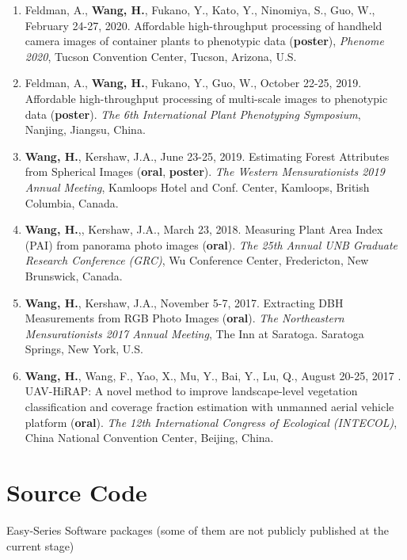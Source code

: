 \begin{singlespace}
\begin{enumerate}
  \item Feldman, A., \textbf{Wang, H.}, Fukano, Y., Kato, Y., Ninomiya, S., Guo, W., February 24-27, 2020. Affordable high-throughput processing of handheld camera images of container plants to phenotypic data (\textbf{poster}), \textit{Phenome 2020}, Tucson Convention Center, Tucson, Arizona, U.S.
  \item Feldman, A., \textbf{Wang, H.}, Fukano, Y., Guo, W., October 22-25, 2019. Affordable high-throughput processing of multi-scale images to phenotypic data (\textbf{poster}). \textit{The 6th International Plant Phenotyping Symposium}, Nanjing, Jiangsu, China.
  \item \textbf{Wang, H.}, Kershaw, J.A., June 23-25, 2019. Estimating Forest Attributes from Spherical Images (\textbf{oral}, \textbf{poster}). \textit{The Western Mensurationists 2019 Annual Meeting}, Kamloops Hotel and Conf. Center, Kamloops, British Columbia, Canada.
  \item \textbf{Wang, H.},, Kershaw, J.A., March 23, 2018. Measuring Plant Area Index (PAI) from panorama photo images (\textbf{oral}). \textit{The 25th Annual UNB Graduate Research Conference (GRC)}, Wu Conference Center, Fredericton, New Brunswick, Canada.
  \item \textbf{Wang, H.}, Kershaw, J.A., November 5-7, 2017. Extracting DBH Measurements from RGB Photo Images (\textbf{oral}). \textit{The Northeastern Mensurationists 2017 Annual Meeting}, The Inn at Saratoga. Saratoga Springs, New York, U.S.
  \item \textbf{Wang, H.}, Wang, F., Yao, X., Mu, Y., Bai, Y., Lu, Q., August 20-25, 2017 . UAV-HiRAP: A novel method to improve landscape-level vegetation classification and coverage fraction estimation with unmanned aerial vehicle platform (\textbf{oral}). \textit{The 12th International Congress of Ecological (INTECOL)}, China National Convention Center, Beijing, China.
\end{enumerate}

\section*{Source Code}

\noindent
Easy-Series Software packages (some of them are not publicly published at the current stage)


\end{singlespace}
